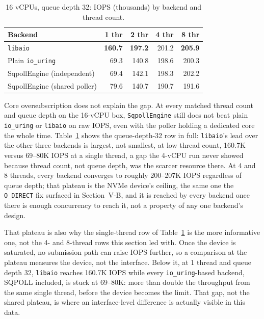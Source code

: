 \documentclass[conference]{IEEEtran}
\begin{document}
\begin{table}[t]
\centering
\caption{16 vCPUs, queue depth 32: IOPS (thousands) by backend and thread count.}
\label{tab:16vcpu-qd32}
\begin{tabular}{lrrrr}
\toprule
Backend & 1 thr & 2 thr & 4 thr & 8 thr \\
\midrule
\texttt{libaio} & \textbf{160.7} & \textbf{197.2} & 201.2 & \textbf{205.9} \\
Plain \texttt{io\_uring} & 69.3 & 140.8 & 198.6 & 200.3 \\
SqpollEngine (independent) & 69.4 & 142.1 & 198.3 & 202.2 \\
SqpollEngine (shared poller) & 79.6 & 140.7 & 190.7 & 191.6 \\
\bottomrule
\end{tabular}
\end{table}

Core oversubscription does not explain the gap. At every matched thread count and queue depth on
the 16-vCPU box, \texttt{SqpollEngine} still does not beat plain \texttt{io\_uring} or
\texttt{libaio} on raw IOPS, even with the poller holding a dedicated core the whole time.
Table~\ref{tab:16vcpu-qd32} shows the queue-depth-32 row in full: \texttt{libaio}'s lead over the
other three backends is largest, not smallest, at low thread count, 160.7K versus 69--80K IOPS at
a single thread, a gap the 4-vCPU run never showed because thread count, not queue depth, was the
scarcer resource there. At 4 and 8 threads, every backend converges to roughly 200--207K IOPS
regardless of queue depth; that plateau is the NVMe device's ceiling, the same one the
\texttt{O\_DIRECT} fix surfaced in Section~V-B, and it is reached by every backend once there is
enough concurrency to reach it, not a property of any one backend's design.

That plateau is also why the single-thread row of Table~\ref{tab:16vcpu-qd32} is the more
informative one, not the 4- and 8-thread rows this section led with. Once the device is
saturated, no submission path can raise IOPS further, so a comparison at the plateau measures
the device, not the interface. Below it, at 1 thread and queue depth 32, \texttt{libaio} reaches
160.7K IOPS while every \texttt{io\_uring}-based backend, SQPOLL included, is stuck at 69--80K:
more than double the throughput from the same single thread, before the device becomes the
limit. That gap, not the shared plateau, is where an interface-level difference is actually
visible in this data.
\end{document}
